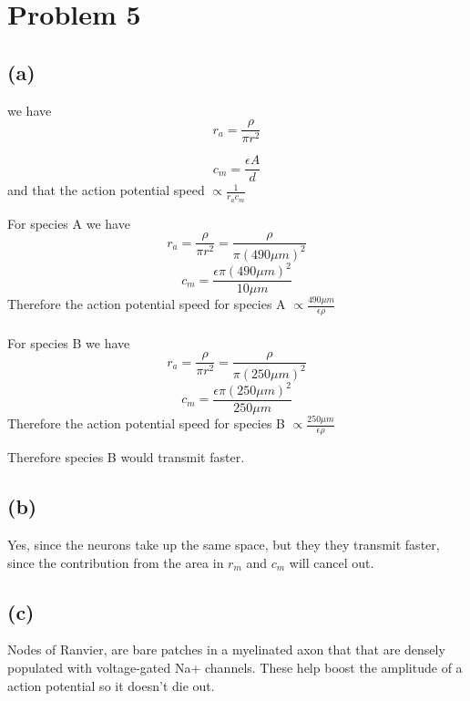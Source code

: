 \documentclass[12pt]{article}
\begin{document}
\section*{Problem 5}
\subsection*{(a)}
we have
$$r_a=\frac{\rho}{\pi r^2}$$

$$c_m=\frac{\epsilon A}{d}$$
and that the action potential speed $\propto\frac{1}{r_ac_m}$


For species A we have
$$r_a=\frac{\rho}{\pi r^2}=\frac{\rho}{\pi (490\mu m)^2}$$
$$c_m=\frac{\epsilon \pi(490\mu m)^2}{10\mu m}$$Therefore the action potential speed for species A $\propto\frac{490\mu m}{\epsilon \rho}$\\\\
For species B we have
$$r_a=\frac{\rho}{\pi r^2}=\frac{\rho}{\pi (250\mu m)^2}$$
$$c_m=\frac{\epsilon \pi(250\mu m)^2}{250\mu m}$$
Therefore the action potential speed for species B $\propto\frac{250\mu m}{\epsilon \rho}$

Therefore species B would transmit faster.
\subsection*{(b)}
Yes, since the neurons take up the same space, but they they transmit faster, since the contribution from the area in $r_m$ and $c_m$ will cancel out.

\subsection*{(c)}
Nodes of Ranvier, are bare patches in a myelinated axon that that are densely populated with voltage-gated Na+ channels. These help boost the amplitude of a action potential so it doesn't die out.



 
\end{document}
